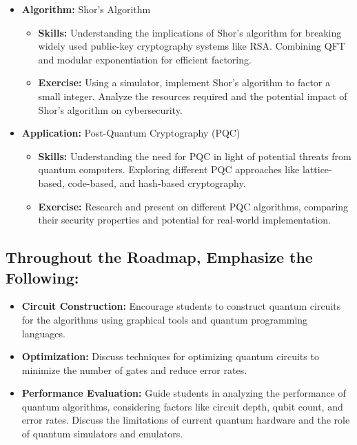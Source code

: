 \begin{itemize}
    \item \textbf{Algorithm:} Shor's Algorithm
    \begin{itemize}
        \item \textbf{Skills:} Understanding the implications of Shor's algorithm for breaking widely used public-key cryptography systems like RSA. Combining QFT and modular exponentiation for efficient factoring.
        \item \textbf{Exercise:} Using a simulator, implement Shor's algorithm to factor a small integer. Analyze the resources required and the potential impact of Shor's algorithm on cybersecurity.
    \end{itemize}
    
    \item \textbf{Application:} Post-Quantum Cryptography (PQC)
    \begin{itemize}
        \item \textbf{Skills:} Understanding the need for PQC in light of potential threats from quantum computers. Exploring different PQC approaches like lattice-based, code-based, and hash-based cryptography.
        \item \textbf{Exercise:} Research and present on different PQC algorithms, comparing their security properties and potential for real-world implementation.
    \end{itemize}
\end{itemize}

\subsection{Throughout the Roadmap, Emphasize the Following:}

\begin{itemize}
    \item \textbf{Circuit Construction:} Encourage students to construct quantum circuits for the algorithms using graphical tools and quantum programming languages.
    \item \textbf{Optimization:} Discuss techniques for optimizing quantum circuits to minimize the number of gates and reduce error rates.
    \item \textbf{Performance Evaluation:} Guide students in analyzing the performance of quantum algorithms, considering factors like circuit depth, qubit count, and error rates. Discuss the limitations of current quantum hardware and the role of quantum simulators and emulators.
\end{itemize}

